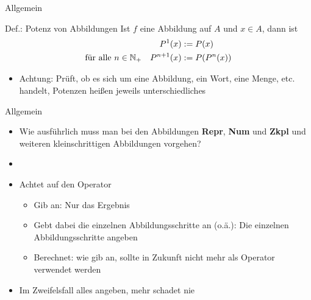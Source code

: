 \newcommand{\lul}[2]{
	\temporal<2>{#1}{\textcolor{red}{#1}}{\textcolor{kit-green100}{#2}}
}

\newcommand{\lulz}[1]{\lul{#1}{#1}}




\begin{frame}{Allgemein}
    \begin{block}{Def.: Potenz von Abbildungen}
    	Ist $f$ eine Abbildung auf $A$ und $x \in A$, dann ist
    	\begin{align*}
    		P^1(x) &:= P(x) \\
    		\text{für alle } n\in \mathbb{N}_+ \quad P^{n+1}(x) &:= P(P^n(x))
    	\end{align*}
    \end{block}

    \begin{itemize}
    	\item \alert{Achtung}: Prüft, ob es sich um eine Abbildung, ein Wort, eine Menge, etc. handelt, Potenzen heißen jeweils unterschiedliches
    \end{itemize}

\end{frame}

\begin{frame}{Allgemein}
\begin{itemize}
	\item Wie ausführlich muss man bei den Abbildungen \textbf{Repr}, \textbf{Num} und \textbf{Zkpl} und weiteren kleinschrittigen Abbildungen vorgehen?
	\item[]
	\item Achtet auf den Operator
	\begin{itemize}
		\item Gib an: Nur das Ergebnis
		\item Gebt dabei die einzelnen Abbildungsschritte an (o.ä.): Die einzelnen Abbildungsschritte angeben
		\item Berechnet: wie gib an, sollte in Zukunft nicht mehr als Operator verwendet werden
	\end{itemize}
	\item Im Zweifelsfall alles angeben, mehr schadet nie
\end{itemize}
\end{frame}




